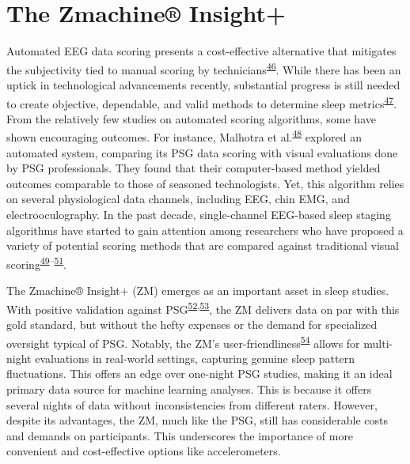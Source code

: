 \documentclass[
  10pt,
]{scrbook}
\begin{document}
\hypertarget{the-zmachine-insight}{%
\section{The Zmachine® Insight+}\label{the-zmachine-insight}}

Automated EEG data scoring presents a cost-effective alternative that
mitigates the subjectivity tied to manual scoring by
technicians\textsuperscript{\protect\hyperlink{ref-redline_2013}{46}}.
While there has been an uptick in technological advancements recently,
substantial progress is still needed to create objective, dependable,
and valid methods to determine sleep
metrics\textsuperscript{\protect\hyperlink{ref-berthomier_2013}{47}}.
From the relatively few studies on automated scoring algorithms, some
have shown encouraging outcomes. For instance, Malhotra et
al.\textsuperscript{\protect\hyperlink{ref-malhotra_2013}{48}} explored
an automated system, comparing its PSG data scoring with visual
evaluations done by PSG professionals. They found that their
computer-based method yielded outcomes comparable to those of seasoned
technologists. Yet, this algorithm relies on several physiological data
channels, including EEG, chin EMG, and electrooculography. In the past
decade, single-channel EEG-based sleep staging algorithms have started
to gain attention among researchers who have proposed a variety of
potential scoring methods that are compared against traditional visual
scoring\textsuperscript{\protect\hyperlink{ref-koley_2012}{49}--\protect\hyperlink{ref-zhu_2014}{51}}.

The Zmachine® Insight+ (ZM) emerges as an important asset in sleep
studies. With positive validation against
PSG\textsuperscript{\protect\hyperlink{ref-kaplan_performance_2014}{52},\protect\hyperlink{ref-wang_evaluation_2015}{53}},
the ZM delivers data on par with this gold standard, but without the
hefty expenses or the demand for specialized oversight typical of PSG.
Notably, the ZM's
user-friendliness\textsuperscript{\protect\hyperlink{ref-pedersen_self-administered_2021}{54}}
allows for multi-night evaluations in real-world settings, capturing
genuine sleep pattern fluctuations. This offers an edge over one-night
PSG studies, making it an ideal primary data source for machine learning
analyses. This is because it offers several nights of data without
inconsistencies from different raters. However, despite its advantages,
the ZM, much like the PSG, still has considerable costs and demands on
participants. This underscores the importance of more convenient and
cost-effective options like accelerometers.
\end{document}
